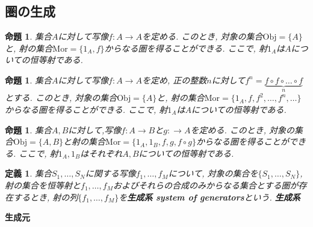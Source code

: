 \documentclass[dvipdfmx]{jsbook}
\theoremstyle{plain}
\newtheorem{Def}[thm]{定義}
\newtheorem{Prop}[thm]{命題}
\begin{document}
\subsection{圏の生成}
\begin{Prop}
集合$A$に対して写像$f:A\rightarrow A$を定める.
このとき, 対象の集合$\mathrm{Obj}=\{A\}$と, 射の集合$\mathrm{Mor}=\{1_A,f\}$からなる圏を得ることができる.
ここで, 射$1_A$は$A$についての恒等射である.
\end{Prop}
\begin{comment}
\begin{proof}
$\mathrm{dom} f=\mathrm{cod}f$であるから, 合成射$f\circ f$を定めることができる.
このとき$f\circ f=1_A$もしくは$f\circ f=f$である.

$f\circ f=1_A$ならば...

...

となる.
一方, $f\circ f=1_A$ならば...

...

となる.
以上より, いずれの場合も, 射の合成が結合律を満たすことがわかる.
したがって$f\circ f=1_A$と定めても$f\circ f=f$と定めても圏を生成することができる.
\end{proof}
\end{comment}
\begin{Prop}
集合$A$に対して写像$f:A\rightarrow A$を定め, 正の整数$n$に対して$f^n=\underbrace{f\circ f \circ \dots \circ f}_{n}$
とする.
このとき, 対象の集合$\mathrm{Obj}=\{A\}$と, 射の集合$\mathrm{Mor}=\{1_A,f,f^2,\dots,f^n,\dots\}$からなる圏を得ることができる.
ここで, 射$1_A$は$A$についての恒等射である.
\end{Prop}
\begin{comment}
\begin{proof}
\end{proof}
\end{comment}
\begin{Prop}
集合$A,B$に対して,写像$f:A\rightarrow B$と$g:\rightarrow A$を定める.
このとき, 対象の集合$\mathrm{Obj}=\{A,B\}$と射の集合$\mathrm{Mor}=\{1_A,1_B,f,g,f\circ g\}$からなる圏を得ることができる.
ここで, 射$1_A,1_B$はそれぞれ$A,B$についての恒等射である.
\end{Prop}
\begin{comment}
\begin{proof}
\end{proof}
\end{comment}
\begin{Def}
集合$S_1,\dots,S_N$に関する写像$f_1,\dots,f_M$について,
対象の集合を$\{S_1,\dots,S_N\}$,
射の集合を恒等射と$f_1,\dots,f_M$およびそれらの合成のみからなる集合とする圏が存在するとき, 射の列$\{f_1,\dots,f_M\}$を{\bf 生成系 system of generators}という.
{\bf 生成系}
\end{Def}
{\bf 生成元}
\end{document}
